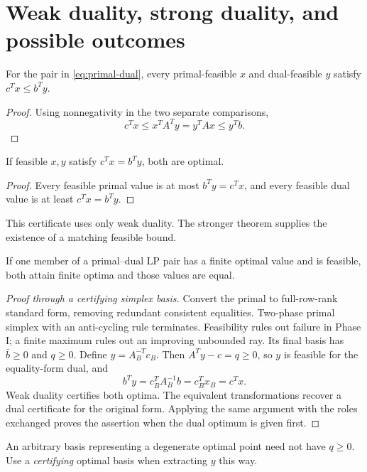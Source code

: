 \documentclass[11pt,a4paper]{article}
\begin{document}
\section{Weak duality, strong duality, and possible outcomes}\label{sec:duality}
\begin{lecturecore}
  \begin{theorem}
    For the pair in \eqref{eq:primal-dual}, every primal-feasible $x$ and
    dual-feasible $y$ satisfy $c^Tx\leq b^Ty$.
  \end{theorem}
\end{lecturecore}
\begin{proof}
  Using nonnegativity in the two separate comparisons,
  \[
    c^Tx\leq x^TA^Ty=y^TAx\leq y^Tb.
  \]
\end{proof}
\begin{corollary}
  If feasible $x,y$ satisfy $c^Tx=b^Ty$, both are optimal.
\end{corollary}
\begin{proof}
  Every feasible primal value is at most $b^Ty=c^Tx$, and every feasible dual
  value is at least $c^Tx=b^Ty$.
\end{proof}
This certificate uses only weak duality. The stronger theorem supplies the
existence of a matching feasible bound.
\begin{lecturecore}
  \begin{theorem}\label{thm:strong}
    If one member of a primal--dual LP pair has a finite optimal value and is
    feasible, both attain finite optima and those values are equal.
  \end{theorem}
\end{lecturecore}
\begin{proof}[Proof through a certifying simplex basis]
  Convert the primal to full-row-rank standard form, removing redundant
  consistent equalities. Two-phase primal simplex with an anti-cycling rule
  terminates. Feasibility rules out failure in Phase I; a finite maximum rules
  out an improving unbounded ray. Its final basis has
  $\bar b\geq0$ and $q\geq0$. Define $y=A_B^{-T}c_B$.
  Then $A^Ty-c=q\geq0$, so $y$ is feasible for the equality-form dual, and
  \[
    b^Ty=c_B^TA_B^{-1}b=c_B^Tx_B=c^Tx.
  \]
  Weak duality certifies both optima. The equivalent transformations recover a
  dual certificate for the original form. Applying the same argument with the
  roles exchanged proves the assertion when the dual optimum is given first.
\end{proof}
An arbitrary basis representing a degenerate optimal point need not have
$q\geq0$. Use a \emph{certifying} optimal basis when extracting $y$ this way.
\end{document}

